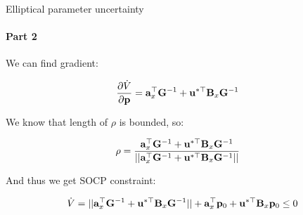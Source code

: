 \documentclass{beamer}
\begin{document}
\begin{frame}{Elliptical parameter uncertainty}
\framesubtitle{Part 2}
\begin{flushleft}

We can find gradient:

\begin{align}
& \frac{\partial \dot{V}}{\partial  \mathbf{p}}  = 
\mathbf{a}_x^\top \mathbf{G}^{-1}  + 
\mathbf{u}^{*\top} \mathbf{B}_x \mathbf{G}^{-1}
\end{align}

We know that length of $\rho$ is bounded, so:

\begin{align}
& \rho  = 
\frac{\mathbf{a}_x^\top \mathbf{G}^{-1}  + 
\mathbf{u}^{*\top} \mathbf{B}_x \mathbf{G}^{-1}}{|| \mathbf{a}_x^\top \mathbf{G}^{-1}  + 
\mathbf{u}^{*\top} \mathbf{B}_x \mathbf{G}^{-1} ||}
\end{align}

And thus we get SOCP constraint:

\begin{equation}
\dot{V} = 
|| \mathbf{a}_x^\top \mathbf{G}^{-1}  + 
\mathbf{u}^{*\top} \mathbf{B}_x \mathbf{G}^{-1} ||
+ 
\mathbf{a}_x^\top \mathbf{p}_0 + 
\mathbf{u}^{*\top} \mathbf{B}_x \mathbf{p}_0 \leq 0 
\end{equation}


\end{flushleft}
\end{frame}



 
 


\end{document}
